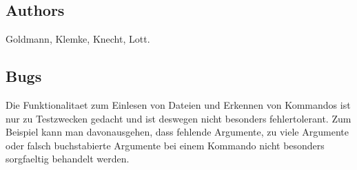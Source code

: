 \subsection*{Authors}
Goldmann, Klemke, Knecht, Lott.

\subsection*{Bugs}

Die Funktionalitaet zum Einlesen von Dateien und Erkennen von
Kommandos ist nur zu Testzwecken gedacht und ist deswegen nicht
besonders fehlertolerant.  Zum Beispiel kann man davonausgehen, 
dass fehlende Argumente, zu viele Argumente oder falsch buchstabierte
Argumente bei einem Kommando nicht besonders sorgfaeltig behandelt
werden. 
